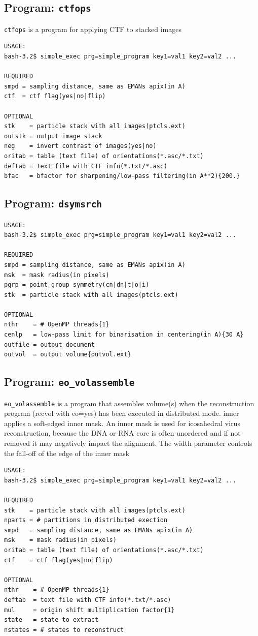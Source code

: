 \documentclass[a4paper,11pt]{article}
\newcommand{\prgname}[1]{\textcolor{NavyBlue}{\texttt{#1}}}
\begin{document}
\subsection{Program: \prgname{ctfops}}
\label{ctfops}
\prgname{ctfops} is a program for applying CTF to stacked images 

\begin{verbatim}
USAGE:
bash-3.2$ simple_exec prg=simple_program key1=val1 key2=val2 ...

REQUIRED
smpd = sampling distance, same as EMANs apix(in A)
ctf  = ctf flag(yes|no|flip)

OPTIONAL
stk    = particle stack with all images(ptcls.ext)
outstk = output image stack
neg    = invert contrast of images(yes|no)
oritab = table (text file) of orientations(*.asc/*.txt)
deftab = text file with CTF info(*.txt/*.asc)
bfac   = bfactor for sharpening/low-pass filtering(in A**2){200.}
\end{verbatim}

\subsection{Program: \prgname{dsymsrch}}
\label{dsymsrch}
\begin{verbatim}
USAGE:
bash-3.2$ simple_exec prg=simple_program key1=val1 key2=val2 ...

REQUIRED
smpd = sampling distance, same as EMANs apix(in A)
msk  = mask radius(in pixels)
pgrp = point-group symmetry(cn|dn|t|o|i)
stk  = particle stack with all images(ptcls.ext)

OPTIONAL
nthr    = # OpenMP threads{1}
cenlp   = low-pass limit for binarisation in centering(in A){30 A}
outfile = output document
outvol  = output volume{outvol.ext}
\end{verbatim}

\subsection{Program: \prgname{eo\_volassemble}}
\label{eo_volassemble}
\prgname{eo\_volassemble} is a program that assembles volume(s) when the reconstruction program (recvol with eo=yes) has been executed in distributed mode. inner applies a soft-edged inner mask. An inner mask is used for icosahedral virus reconstruction, because the DNA or RNA core is often unordered and  if not removed it may negatively impact the alignment. The width parameter controls the fall-off of the edge of the inner mask

\begin{verbatim}
USAGE:
bash-3.2$ simple_exec prg=simple_program key1=val1 key2=val2 ...

REQUIRED
stk    = particle stack with all images(ptcls.ext)
nparts = # partitions in distributed exection
smpd   = sampling distance, same as EMANs apix(in A)
msk    = mask radius(in pixels)
oritab = table (text file) of orientations(*.asc/*.txt)
ctf    = ctf flag(yes|no|flip)

OPTIONAL
nthr    = # OpenMP threads{1}
deftab  = text file with CTF info(*.txt/*.asc)
mul     = origin shift multiplication factor{1}
state   = state to extract
nstates = # states to reconstruct
\end{verbatim}
\end{document}
